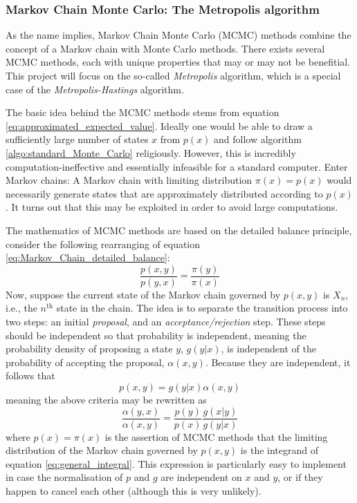 \documentclass[nofootinbib,reprint,english]{revtex4-1}
\begin{document}
\subsubsection{Markov Chain Monte Carlo: The Metropolis algorithm}
As the name implies, Markov Chain Monte Carlo (MCMC) methods combine the concept of a Markov chain with Monte Carlo methods. There exists several MCMC methods, each with unique properties that may or may not be benefitial. This project will focus on the so-called \emph{Metropolis} algorithm, which is a special case of the \emph{Metropolis-Hastings} algorithm.

The basic idea behind the MCMC methods stems from equation \eqref{eq:approximated_expected_value}. Ideally one would be able to draw a sufficiently large number of states \(x\) from \(p(x)\) and follow algorithm \ref{algo:standard_Monte_Carlo} religiously. However, this is incredibly computation-ineffective and essentially infeasible for a standard computer. Enter Markov chains: A Markov chain with limiting distribution \(\pi(x)=p(x)\) would necessarily generate states that are approximately distributed according to \(p(x)\). It turns out that this may be exploited in order to avoid large computations.

The mathematics of MCMC methods are based on the detailed balance principle, consider the following rearranging of equation \eqref{eq:Markov_Chain_detailed_balance}:
\[\frac{p(x,y)}{p(y,x)}=\frac{\pi(y)}{\pi(x)}\]
Now, suppose the current state of the Markov chain governed by \(p(x,y)\) is \(X_n\), i.e., the \(n^\text{th}\) state in the chain. The idea is to separate the transition process into two steps: an initial \emph{proposal}, and an \emph{acceptance/rejection} step. These steps should be independent so that probability is independent, meaning the probability density of proposing a state \(y\), \(g(y|x)\), is independent of the probability of accepting the proposal, \(\alpha(x,y)\). Because they are independent, it follows that
\begin{equation}
p(x,y)=g(y|x)\alpha(x,y)
\end{equation}
meaning the above criteria may be rewritten as
\begin{equation}\label{eq:MCMC_detailed_balance_with_TandA}
\frac{\alpha(y,x)}{\alpha(x,y)}=\frac{p(y)}{p(x)}\frac{g(x|y)}{g(y|x)}
\end{equation}
where \(p(x)=\pi(x)\) is the assertion of MCMC methods that the limiting distribution of the Markov chain governed by \(p(x,y)\) is the integrand of equation \eqref{eq:general_integral}. This expression is particularly easy to implement in case the normalisation of \(p\) and \(g\) are independent on \(x\) and \(y\), or if they happen to cancel each other (although this is very unlikely).
\end{document}
